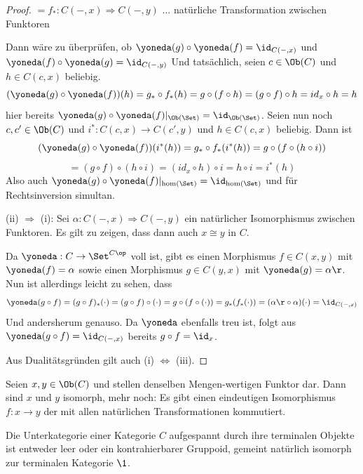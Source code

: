 \documentclass[11pt]{article}
\begin{document}
\begin{theorem}
\begin{proof}
$\displaystyle = f_*: C(-,x) \Longrightarrow C(-,y)$ ... natürliche Transformation zwischen Funktoren\bigskip

Dann wäre zu überprüfen, ob $\yoneda(g) \circ \yoneda(f) = \id_{C(-,x)}$ und $\yoneda(f)\circ \yoneda(g) = \id_{C(-,y)}$
Und tatsächlich, seien $c\in \Ob(C)$ und $h\in C(c,x)$ beliebig.
$$(\yoneda(g)\circ \yoneda(f))(h) = g_*\circ f_*(h) = g\circ (f\circ h) = (g\circ f)\circ h = id_x \circ h = h$$
hier bereits $\yoneda(g) \circ \yoneda(f)|_{\Ob(\Set)} = \id_{\Ob(\Set)}$.
Seien nun noch $c,c'\in \Ob(C)$ und $i^*: C(c,x) \to C(c',y)$ und $h\in C(c,x)$ beliebig. Dann ist
$$(\yoneda(g)\circ \yoneda(f))(i^*(h)) = g_*\circ f_*(i^*(h)) = g\circ (f\circ (h\circ i)) $$
$$= (g\circ f)\circ (h\circ i) = (id_x \circ  h) \circ i =  h\circ i = i^*(h)$$
Also auch $\yoneda(g)\circ \yoneda(f)|_{\hom(\Set)} = \id_{\hom(\Set)}$ und für Rechtsinversion simultan. \bigskip

(ii) $\Longrightarrow$ (i): Sei $\alpha: C(-,x) \Longrightarrow C(-,y)$ ein natürlicher Isomorphismus zwischen Funktoren. Es gilt zu zeigen, dass dann auch $x\cong y$ in $C$. \bigskip

Da $\yoneda: C \to \Set^{C\op}$ voll ist, gibt es einen Morphismus $f\in C(x,y)$ mit $\yoneda(f) = \alpha$ sowie einen Morphismus $g\in C(y,x)$ mit $\yoneda(g) = \alpha\r$. Nun ist allerdings leicht zu sehen, dass 
$$\yoneda(g\circ f) = (g\circ f)_* (\cdot) = (g\circ f)\circ(\cdot) = g\circ(f\circ(\cdot))= g_*(f_*(\cdot))=(\alpha\r\circ\alpha)(\cdot)= \id_{C(-,x)}$$
Und andersherum genauso. Da $\yoneda$ ebenfalls treu ist, folgt aus $\yoneda(g\circ f) = \id_{C(-,x)}$ bereits $g\circ f = \id_x$.\bigskip

Aus Dualitätsgründen gilt auch (i) $\Longleftrightarrow$ (iii). 
\end{proof}
\end{theorem}

\begin{corollary}
    Seien $x,y\in \Ob(C)$ und stellen denselben Mengen-wertigen Funktor dar. Dann sind $x$ und $y$ isomorph, mehr noch: Es gibt einen eindeutigen Isomorphismus $f: x\to y$ der mit allen natürlichen Transformationen kommutiert.
\end{corollary}

\begin{corollary}
    Die Unterkategorie einer Kategorie $C$ aufgespannt durch ihre terminalen Objekte ist entweder leer oder ein kontrahierbarer Gruppoid, gemeint natürlich isomorph zur terminalen Kategorie $\1$.
\end{corollary}
\end{document}
